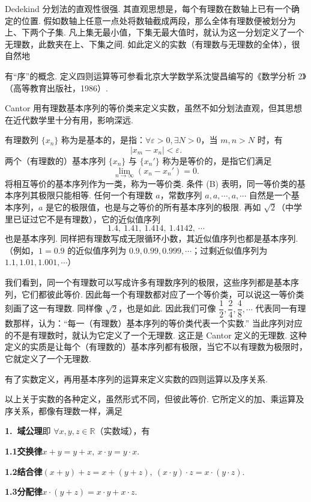 \documentclass[UTF8, 12pt, fontset=fandol, oneside]{ctexart}
\begin{document}
Dedekind 分划法的直观性很强. 其直观思想是，每个有理数在数轴上已有一个确定的位置. 假如数轴上任意一点处将数轴截成两段，那么全体有理数便被划分为上、下两个子集. 凡上集无最小值，下集无最大值时，就认为这一分划定义了一个无理数，此数夹在上、下集之间. 如此定义的实数（有理数与无理数的全体），很自然地

有“序”的概念. 定义四则运算等可参看北京大学数学系沈燮昌编写的《数学分析 2》（高等教育出版社，1986）.

Cantor 用有理数基本序列的等价类来定义实数，虽然不如分划法直观，但其思想在近代数学里十分有用，影响深远.

有理数列 $\{x_n\}$ 称为是基本的，是指：$\forall \varepsilon>0,\exists N>0$，当 $m,n>N$ 时，有
\[
  |x_m-x_n|<\varepsilon.
\tag{A}
\]
两个（有理数的）基本序列 $\{x_n\}$ 与 $\{x_n'\}$ 称为是等价的，是指它们满足
\[
  \lim_{n\to\infty}(x_n-x_n')=0.
\tag{B}
\]
将相互等价的基本序列作为一类，称为一等价类. 条件 (B) 表明，同一等价类的基本序列其极限只能相等. 任何一个有理数 $a$，常数序列 $a,a,\cdots,a,\cdots$ 自然是一个基本序列，$a$ 是它的极限值，也是与之等价的所有基本序列的极限. 再如 $\sqrt2$（中学里已证过它不是有理数），它的近似值序列
\[
  1.4,\ 1.41,\ 1.414,\ 1.4142,\ \cdots
\]
也是基本序列. 同样把有理数写成无限循环小数，其近似值序列也都是基本序列.（例如，$1=0.\dot9$ 的近似值序列为 $0.9,0.99,0.999,\cdots$；过剩近似值序列为 $1.1,1.01,1.001,\cdots$）

我们看到，同一个有理数可以写成许多有理数序列的极限，这些序列都是基本序列，它们都彼此等价. 因此每一个有理数都对应了一个等价类，可以说这一等价类刻画了这一有理数. 同样像 $\sqrt2$，也是如此. 因此我们可像 $\dfrac12,\dfrac24,\dfrac48,\cdots$ 代表同一有理数那样，认为：“每一（有理数）基本序列的等价类代表一个实数.” 当此序列对应的不是有理数时，就认为它定义了一个无理数. 这正是 Cantor 定义的无理数. 这种定义的实质是让每个（有理数的）基本序列都有极限，当它不以有理数为极限时，它就定义了一个无理数.

有了实数定义，再用基本序列的运算来定义实数的四则运算以及序关系.

以上关于实数的各种定义，虽然形式不同，但彼此等价. 它所定义的加、乘运算及序关系，都像有理数一样，满足

\noindent\textbf{1.\ 域公理}\quad 即 $\forall x,y,z\in \mathbb{R}$（实数域），有

\noindent\textbf{1.1\quad 交换律}\quad $x+y=y+x,\ x\cdot y=y\cdot x$.

\noindent\textbf{1.2\quad 结合律}\quad $(x+y)+z=x+(y+z),\ (x\cdot y)\cdot z=x\cdot(y\cdot z)$.

\noindent\textbf{1.3\quad 分配律}\quad $x\cdot(y+z)=x\cdot y+x\cdot z$.
\end{document}
